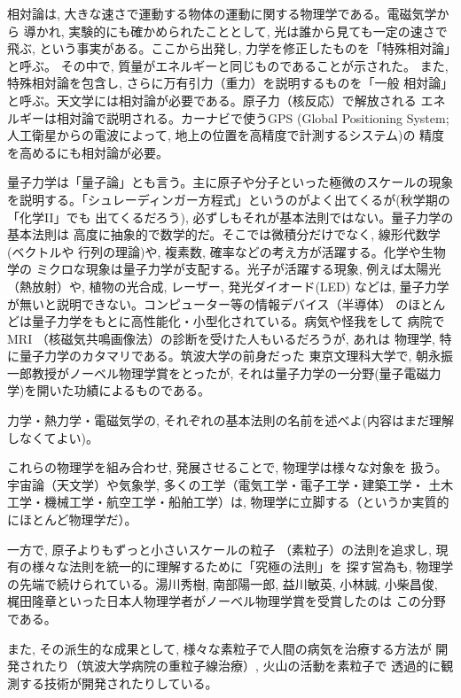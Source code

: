 相対論は, 大きな速さで運動する物体の運動に関する物理学である。電磁気学から
導かれ, 実験的にも確かめられたこととして, 光は誰から見ても一定の速さで飛ぶ, 
という事実がある。ここから出発し, 力学を修正したものを「特殊相対論」と呼ぶ。
その中で, 質量がエネルギーと同じものであることが示された。
また, 特殊相対論を包含し, さらに万有引力（重力）を説明するものを「一般
相対論」と呼ぶ。天文学には相対論が必要である。原子力（核反応）で解放される
エネルギーは相対論で説明される。カーナビで使うGPS (Global Positioning System; 
人工衛星からの電波によって, 地上の位置を高精度で計測するシステム)の
精度を高めるにも相対論が必要。

量子力学は「量子論」とも言う。主に原子や分子といった極微のスケールの現象
を説明する。「シュレーディンガー方程式」というのがよく出てくるが(秋学期の「化学II」でも
出てくるだろう), 必ずしもそれが基本法則ではない。量子力学の基本法則は
高度に抽象的で数学的だ。そこでは微積分だけでなく, 線形代数学(ベクトルや
行列の理論)や, 複素数, 確率などの考え方が活躍する。化学や生物学の
ミクロな現象は量子力学が支配する。光子が活躍する現象, 
例えば太陽光（熱放射）や, 植物の光合成, レーザー, 発光ダイオード(LED)
などは, 量子力学が無いと説明できない。コンピューター等の情報デバイス（半導体）
のほとんどは量子力学をもとに高性能化・小型化されている。病気や怪我をして
病院でMRI （核磁気共鳴画像法）の診断を受けた人もいるだろうが, あれは
物理学, 特に量子力学のカタマリである。筑波大学の前身だった
東京文理科大学で, 朝永振一郎教授がノーベル物理学賞をとったが, 
それは量子力学の一分野(量子電磁力学)を開いた功績によるものである。\mv

\begin{q}\label{q:basic_laws}
力学・熱力学・電磁気学の, それぞれの基本法則の名前を述べよ(内容はまだ理解しなくてよい)。
\end{q}
\vspace{0.2cm}

これらの物理学を組み合わせ, 発展させることで, 物理学は様々な対象を
扱う。宇宙論（天文学）や気象学, 多くの工学（電気工学・電子工学・建築工学・
土木工学・機械工学・航空工学・船舶工学）は, 物理学に立脚する（というか実質的
にほとんど物理学だ）。

一方で, 原子よりもずっと小さいスケールの粒子
（素粒子）の法則を追求し, 現有の様々な法則を統一的に理解するために「究極の法則」を
探す営為も, 物理学の先端で続けられている。湯川秀樹, 南部陽一郎, 益川敏英, 小林誠, 
小柴昌俊, 梶田隆章といった日本人物理学者がノーベル物理学賞を受賞したのは
この分野である。

また, その派生的な成果として, 様々な素粒子で人間の病気を治療する方法が
開発されたり（筑波大学病院の重粒子線治療）, 火山の活動を素粒子で
透過的に観測する技術が開発されたりしている。

